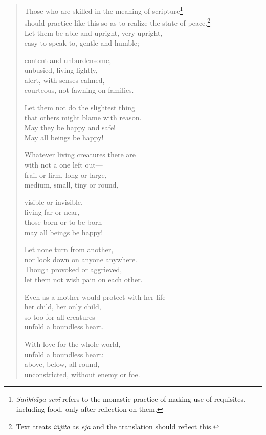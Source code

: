 \documentclass[12pt,openany]{book}%
\begin{document}
\begin{verse}%
Those who are skilled in the meaning of scripture\footnote{\textit{\textsanskrit{Saṅkhāya} \textsanskrit{sevī}} refers to the monastic practice of making use of requisites, including food, only after reflection on them. } \\
should practice like this so as to realize the state of peace.\footnote{Text treats \textit{\textsanskrit{iñjita}} as \textit{eja} and the translation should reflect this. } \\
Let them be able and upright, very upright, \\
easy to speak to, gentle and humble; 

content and unburdensome, \\
unbusied, living lightly, \\
alert, with senses calmed, \\
courteous, not fawning on families. 

Let them not do the slightest thing \\
that others might blame with reason. \\
May they be happy and safe! \\
May all beings be happy! 

Whatever living creatures there are \\
with not a one left out—\\
frail or firm, long or large, \\
medium, small, tiny or round, 

visible or invisible, \\
living far or near, \\
those born or to be born—\\
may all beings be happy! 

Let none turn from another, \\
nor look down on anyone anywhere. \\
Though provoked or aggrieved, \\
let them not wish pain on each other. 

Even as a mother would protect with her life \\
her child, her only child, \\
so too for all creatures \\
unfold a boundless heart. 

With love for the whole world, \\
unfold a boundless heart: \\
above, below, all round, \\
unconstricted, without enemy or foe. 


\end{verse}
\end{document}
